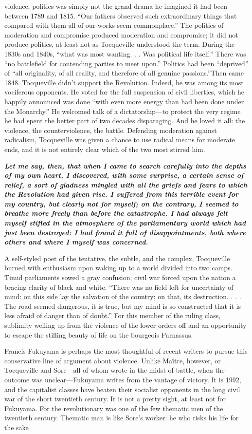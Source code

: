 violence, politics was simply not the grand drama he imagined it had been between 1789 and 1815. “Our fathers observed such extraordinary things that compared with them all of our works seem commonplace.” The politics of moderation and compromise produced moderation and compromise; it did not produce politics, at least not as Tocqueville understood the term. During the 1830s and 1840s, “what was most wanting. . . Was political life itself.” There was “no battlefield for contending parties to meet upon.” Politics had been “deprived” of “all originality, of all reality, and therefore of all genuine passions.”Then came 1848. Tocqueville didn’t support the Revolution. Indeed, he was among its most vociferous opponents. He voted for the full suspension of civil liberties, which he happily announced was done “with even more energy than had been done under the Monarchy.” He welcomed talk of a dictatorship—to protect the very regime he had spent the better part of two decades disparaging. And he loved it all: the violence, the counterviolence, the battle. Defending moderation against radicalism, Tocqueville was given a chance to use radical means for moderate ends, and it is not entirely clear which of the two most stirred him.{\par} {\textbf{\textit{Let me say, then, that when I came to search carefully into the depths of my own heart, I discovered, with some surprise, a certain sense of relief, a sort of gladness mingled with all the griefs and fears to which the Revolution had given rise. I suffered from this terrible event for my country, but clearly not for myself; on the contrary, I seemed to breathe more freely than before the catastrophe. I had always felt myself stifled in the atmosphere of the parliamentary world which had just been destroyed: I had found it full of disappointments, both where others and where I myself was concerned.} } }{\par} A self-styled poet of the tentative, the subtle, and the complex, Tocqueville burned with enthusiasm upon waking up to a world divided into two camps. Timid parliaments sowed a gray confusion; civil war forced upon the nation a bracing clarity of black and white. “There was no field left for uncertainty of mind: on this side lay the salvation of the country; on that, its destruction. . . . The road seemed dangerous, it is true, but my mind is so constructed that it is less afraid of danger than of doubt.” For this member of the ruling class, sublimity welling up from the violence of the lower orders off and an opportunity to escape the stifling beauty of life on the bourgeois Parnassus.{\par} Francis Fukuyama is perhaps the most thoughtful of recent writers to pursue this conservative line of argument about violence. Unlike Maître, however, or Tocqueville and Sore—all of whom wrote in the midst of battle, when the outcome was unclear—Fukuyama writes from the vantage of victory. It is 1992, and the capitalist classes have beaten their socialist opponents in the long civil war of the short twentieth century. It is not a pretty sight, at least not for Fukuyama. For the revolutionary was one of the few thematic men of the twentieth century. Thematic man is like Sore’s worker: he who risks his life for the sake 